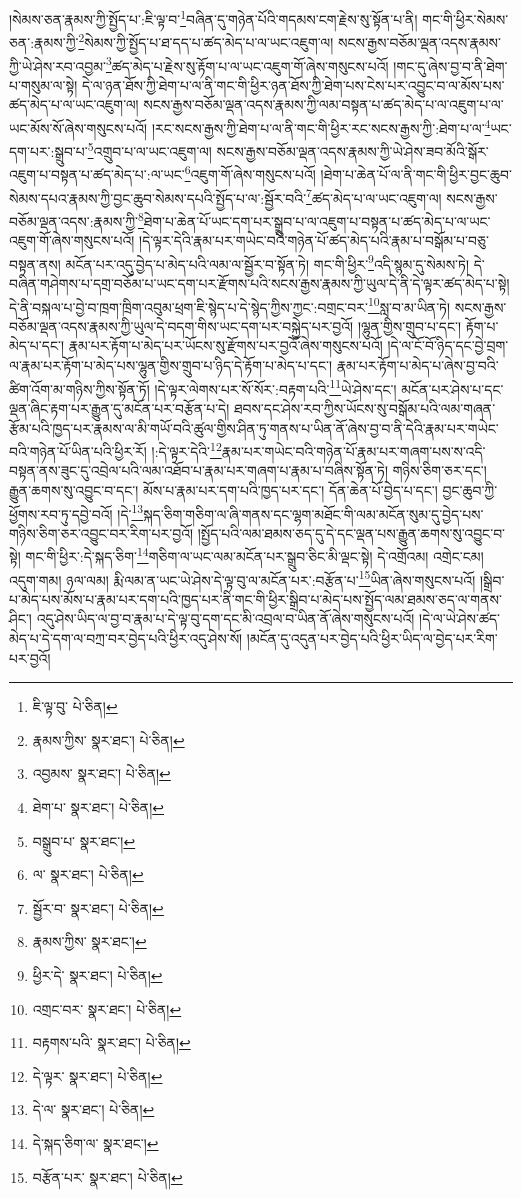 །སེམས་ཅན་རྣམས་ཀྱི་སྤྱོད་པ་:ཇི་ལྟ་བ་\footnote{ཇི་ལྟ་བུ་  པེ་ཅིན། }བཞིན་དུ་གཉེན་པོའི་གདམས་ངག་རྗེས་སུ་སྟོན་པ་ནི། གང་གི་ཕྱིར་སེམས་ཅན་:རྣམས་ཀྱི་\footnote{རྣམས་ཀྱིས་  སྣར་ཐང་།  པེ་ཅིན། }སེམས་ཀྱི་སྤྱོད་པ་ཐ་དད་པ་ཚད་མེད་པ་ལ་ཡང་འཇུག་ལ། སངས་རྒྱས་བཅོམ་ལྡན་འདས་རྣམས་ཀྱི་ཡེ་ཤེས་རབ་འབྱམ་\footnote{འབྱམས་  སྣར་ཐང་།  པེ་ཅིན། }ཚད་མེད་པ་རྗེས་སུ་རྟོག་པ་ལ་ཡང་འཇུག་གོ་ཞེས་གསུངས་པའོ། །གང་དུ་ཞེས་བྱ་བ་ནི་ཐེག་པ་གསུམ་ལ་སྟེ། དེ་ལ་ཉན་ཐོས་ཀྱི་ཐེག་པ་ལ་ནི་གང་གི་ཕྱིར་ཉན་ཐོས་ཀྱི་ཐེག་པས་ངེས་པར་འབྱུང་བ་ལ་མོས་པས་ཚད་མེད་པ་ལ་ཡང་འཇུག་ལ། སངས་རྒྱས་བཅོམ་ལྡན་འདས་རྣམས་ཀྱི་ལམ་བསྟན་པ་ཚད་མེད་པ་ལ་འཇུག་པ་ལ་ཡང་མོས་སོ་ཞེས་གསུངས་པའོ། །རང་སངས་རྒྱས་ཀྱི་ཐེག་པ་ལ་ནི་གང་གི་ཕྱིར་རང་སངས་རྒྱས་ཀྱི་:ཐེག་པ་ལ་\footnote{ཐེག་པ་  སྣར་ཐང་།  པེ་ཅིན། }ཡང་དག་པར་:སྒྲུབ་པ་\footnote{བསྒྲུབ་པ་  སྣར་ཐང་། }འགྲུབ་པ་ལ་ཡང་འཇུག་ལ། སངས་རྒྱས་བཅོམ་ལྡན་འདས་རྣམས་ཀྱི་ཡེ་ཤེས་ཟབ་མོའི་སྒོར་འཇུག་པ་བསྟན་པ་ཚད་མེད་པ་:ལ་ཡང་\footnote{ལ་  སྣར་ཐང་།  པེ་ཅིན། }འཇུག་གོ་ཞེས་གསུངས་པའོ། །ཐེག་པ་ཆེན་པོ་ལ་ནི་གང་གི་ཕྱིར་བྱང་ཆུབ་སེམས་དཔའ་རྣམས་ཀྱི་བྱང་ཆུབ་སེམས་དཔའི་སྤྱོད་པ་ལ་:སྦྱོར་བའི་\footnote{སྦྱོར་བ་  སྣར་ཐང་།  པེ་ཅིན། }ཚད་མེད་པ་ལ་ཡང་འཇུག་ལ། སངས་རྒྱས་བཅོམ་ལྡན་འདས་:རྣམས་ཀྱི་\footnote{རྣམས་ཀྱིས་  སྣར་ཐང་། }ཐེག་པ་ཆེན་པོ་ཡང་དག་པར་སྒྲུབ་པ་ལ་འཇུག་པ་བསྟན་པ་ཚད་མེད་པ་ལ་ཡང་འཇུག་གོ་ཞེས་གསུངས་པའོ། །དེ་ལྟར་དེའི་རྣམ་པར་གཡེང་བའི་གཉེན་པོ་ཚད་མེད་པའི་རྣམ་པ་བསྒོམ་པ་བཅུ་བསྟན་ནས། མངོན་པར་འདུ་བྱེད་པ་མེད་པའི་ལམ་ལ་སྦྱོར་བ་སྟོན་ཏེ། གང་གི་ཕྱིར་\footnote{ཕྱིར་དེ་  སྣར་ཐང་།  པེ་ཅིན། }འདི་སྙམ་དུ་སེམས་ཏེ། དེ་བཞིན་གཤེགས་པ་དགྲ་བཅོམ་པ་ཡང་དག་པར་རྫོགས་པའི་སངས་རྒྱས་རྣམས་ཀྱི་ཡུལ་དེ་ནི་དེ་ལྟར་ཚད་མེད་པ་སྟེ། དེ་ནི་བསྐལ་པ་བྱེ་བ་ཁྲག་ཁྲིག་འབུམ་ཕྲག་ཇི་སྙེད་པ་དེ་སྙེད་ཀྱིས་ཀྱང་:བགྲང་བར་\footnote{འགྲང་བར་  སྣར་ཐང་།  པེ་ཅིན། }སླ་བ་མ་ཡིན་ཏེ། སངས་རྒྱས་བཅོམ་ལྡན་འདས་རྣམས་ཀྱི་ཡུལ་དེ་བདག་གིས་ཡང་དག་པར་བསྐྱེད་པར་བྱའོ། །ལྷུན་གྱིས་གྲུབ་པ་དང་། རྟོག་པ་མེད་པ་དང་། རྣམ་པར་རྟོག་པ་མེད་པར་ཡོངས་སུ་རྫོགས་པར་བྱའོ་ཞེས་གསུངས་པའོ། །དེ་ལ་ངོ་བོ་ཉིད་དང་བྱེ་བྲག་ལ་རྣམ་པར་རྟོག་པ་མེད་པས་ལྷུན་གྱིས་གྲུབ་པ་ཉིད་དེ་རྟོག་པ་མེད་པ་དང་། རྣམ་པར་རྟོག་པ་མེད་པ་ཞེས་བྱ་བའི་ཚིག་འོག་མ་གཉིས་ཀྱིས་སྟོན་ཏོ། །དེ་ལྟར་ལེགས་པར་སོ་སོར་:བརྟག་པའི་\footnote{བརྟགས་པའི་  སྣར་ཐང་།  པེ་ཅིན། }ཡེ་ཤེས་དང་། མངོན་པར་ཤེས་པ་དང་ལྡན་ཞིང་རྟག་པར་རྒྱུན་དུ་མངོན་པར་བརྩོན་པ་དེ། ཐབས་དང་ཤེས་རབ་ཀྱིས་ཡོངས་སུ་བསྒོམ་པའི་ལམ་གཞན་རྩོམ་པའི་ཁྱད་པར་རྣམས་ལ་མི་གཡོ་བའི་ཚུལ་གྱིས་ཤིན་ཏུ་གནས་པ་ཡིན་ནོ་ཞེས་བྱ་བ་ནི་དེའི་རྣམ་པར་གཡེང་བའི་གཉེན་པོ་ཡིན་པའི་ཕྱིར་རོ། །:དེ་ལྟར་དེའི་\footnote{དེ་ལྟར་  སྣར་ཐང་།  པེ་ཅིན། }རྣམ་པར་གཡེང་བའི་གཉེན་པོ་རྣམ་པར་གཞག་པས་ས་འདི་བསྟན་ནས་ཟུང་དུ་འབྲེལ་པའི་ལམ་འཐོབ་པ་རྣམ་པར་གཞག་པ་རྣམ་པ་བཞིས་སྟོན་ཏེ། གཉིས་ཅིག་ཅར་དང་། རྒྱུན་ཆགས་སུ་འབྱུང་བ་དང་། མོས་པ་རྣམ་པར་དག་པའི་ཁྱད་པར་དང་། དོན་ཆེན་པོ་བྱེད་པ་དང་། བྱང་ཆུབ་ཀྱི་ཕྱོགས་རབ་ཏུ་དབྱེ་བའོ། །དེ་\footnote{དེ་ལ་  སྣར་ཐང་།  པེ་ཅིན། }སྐད་ཅིག་གཅིག་ལ་ཞི་གནས་དང་ལྷག་མཐོང་གི་ལམ་མངོན་སུམ་དུ་བྱེད་པས་གཉིས་ཅིག་ཅར་འབྱུང་བར་རིག་པར་བྱའོ། །སྤྱོད་པའི་ལམ་ཐམས་ཅད་དུ་དེ་དང་ལྡན་པས་རྒྱུན་ཆགས་སུ་འབྱུང་བ་སྟེ། གང་གི་ཕྱིར་:དེ་སྐད་ཅིག་\footnote{དེ་སྐད་ཅིག་ལ་  སྣར་ཐང་། }གཅིག་ལ་ཡང་ལམ་མངོན་པར་སྒྲུབ་ཅིང་མི་ལྡང་སྟེ། དེ་འགྲོའམ། འགྲེང་ངམ། འདུག་གམ། ཉལ་ལམ། རྨི་ལམ་ན་ཡང་ཡེ་ཤེས་དེ་ལྟ་བུ་ལ་མངོན་པར་:བརྩོན་པ་\footnote{བརྩོན་པར་  སྣར་ཐང་།  པེ་ཅིན། }ཡིན་ཞེས་གསུངས་པའོ། །སྒྲིབ་པ་མེད་པས་མོས་པ་རྣམ་པར་དག་པའི་ཁྱད་པར་ནི་གང་གི་ཕྱིར་སྒྲིབ་པ་མེད་པས་སྤྱོད་ལམ་ཐམས་ཅད་ལ་གནས་ཤིང་། འདུ་ཤེས་ཡིད་ལ་བྱ་བ་རྣམ་པ་དེ་ལྟ་བུ་དག་དང་མི་འབྲལ་བ་ཡིན་ནོ་ཞེས་གསུངས་པའོ། །དེ་ལ་ཡེ་ཤེས་ཚད་མེད་པ་དེ་དག་ལ་བཀྲ་བར་བྱེད་པའི་ཕྱིར་འདུ་ཤེས་སོ། །མངོན་དུ་འདུན་པར་བྱེད་པའི་ཕྱིར་ཡིད་ལ་བྱེད་པར་རིག་པར་བྱའོ། 